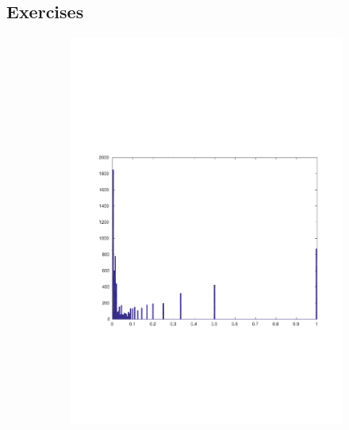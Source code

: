 \documentclass[11pt]{article}\usepackage[]{graphicx}\usepackage[]{color}
\theoremstyle{plain}
\begin{document}
\begin{multicols*}{2}
\section*{Exercises}
  \begin{figure}[p]
    \centering
    \phantom{p}
    \vspace{-6cm}
    \begin{subfigure}[b]{.49\textwidth}
      \includegraphics[width=\textwidth, trim= 4cm 9.5cm 4cm 4cm, clip]{../figures/this_thing_histogram}
      \caption{ }
      \label{fig:human_fig1}
    \end{subfigure}~
    \begin{subfigure}[b]{.5\textwidth}

\end{subfigure}
\end{figure}
\end{multicols*}
\end{document}
